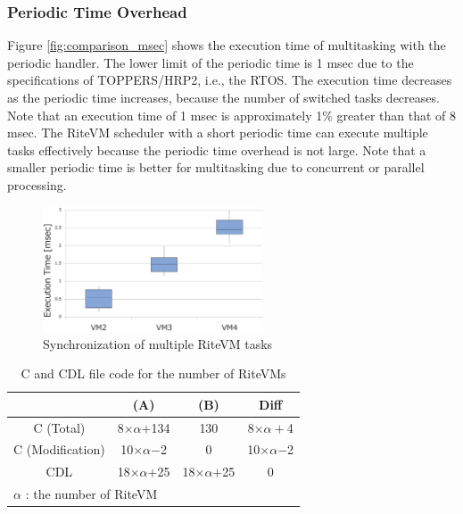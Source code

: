 \documentclass[S,R,E]{article/compsoft}
\begin{document}
\subsubsection{Periodic Time Overhead}
Figure \ref{fig:comparison_msec} shows the execution time of multitasking with the periodic handler.
The lower limit of the periodic time is 1 msec due to the specifications of TOPPERS/HRP2, i.e., the RTOS.
The execution time decreases as the periodic time increases, because the number of switched tasks decreases.
Note that an execution time of 1 msec is approximately 1\% greater than that of 8 msec.
The RiteVM scheduler with a short periodic time can execute multiple tasks effectively because the periodic time overhead is not large.
Note that a smaller periodic time is better for multitasking due to concurrent or parallel processing.

 \begin{figure}[t]
    \centering
    \includegraphics[width=6.5cm,clip]{figure/eval_synchronization.eps}
\caption{Synchronization of multiple RiteVM tasks}
\label{fig:eval_synchronization}
\end{figure}

\begin{table}[t]
    \centering
    \caption{C and CDL file code for the number of RiteVMs}
    {\tabcolsep=0.2cm
    \begin{tabular}{c||c|c|c}
                & (A)       & (B)     & Diff  \\ \hline
        C (Total)      & 8$\times$$\alpha$$+$134  & 130     & 8$\times$$\alpha+$4\\
        C (Modification)   & 10$\times\alpha$$-$2 & 0   &  10$\times\alpha$$-$2 \\
        CDL    & 18$\times$$\alpha$$+$25   & 18$\times$$\alpha$$+$25 & 0     \\
        \multicolumn{3}{l}{{\small $\alpha$} : {\scriptsize the number of RiteVM}}
    \end{tabular}
    }
    \label{tab:codesize}
\end{table}
\end{document}
